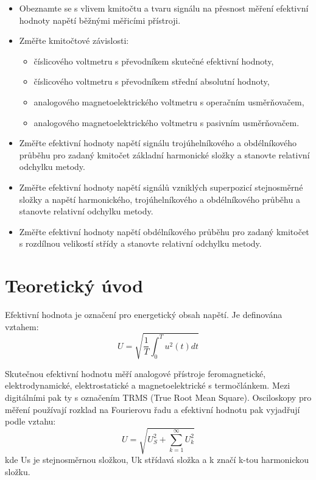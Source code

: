 \documentclass[a4paper, czech]{article}
\begin{document}
\begin{itemize}
    \item Obeznamte se s vlivem kmitočtu a tvaru signálu na přesnost měření efektivní hodnoty
    napětí běžnými měřicími přístroji.
    \item Změřte kmitočtové závislosti:
    \begin{itemize}
        \item číslicového voltmetru s převodníkem skutečné efektivní hodnoty,
        \item číslicového voltmetru s převodníkem střední absolutní hodnoty,
        \item analogového magnetoelektrického voltmetru s operačním usměrňovačem,
        \item analogového magnetoelektrického voltmetru s pasivním usměrňovačem.
    \end{itemize}
    \item Změřte efektivní hodnoty napětí signálu trojúhelníkového a obdélníkového průběhu
    pro zadaný kmitočet základní harmonické složky a stanovte relativní odchylku
    metody.
    \item Změřte efektivní hodnoty napětí signálů vzniklých superpozicí stejnosměrné složky
    a napětí harmonického, trojúhelníkového a obdélníkového průběhu a stanovte relativní
    odchylku metody.
    \item Změřte efektivní hodnoty napětí obdélníkového průběhu pro zadaný kmitočet
    s rozdílnou velikostí střídy a stanovte relativní odchylku metody.
\end{itemize}

\section{Teoretický úvod}

Efektivní hodnota je označení pro energetický obsah napětí.
Je definována vztahem:
\begin{equation*}
    U = \sqrt{\frac{1}{T} \int_0^T u^2\left(t\right) dt}
\end{equation*}

Skutečnou efektivní hodnotu měří analogové přístroje feromagnetické, elektrodynamické, elektrostatické a magnetoelektrické s termočlánkem.
Mezi digitálními pak ty s označením TRMS (True Root Mean Square).
Osciloskopy pro měření používají rozklad na Fourierovu řadu a efektivní hodnotu pak vyjadřují podle vztahu:
\begin{equation*}
    U = \sqrt{U_S^2 + \sum_{k=1}^{\infty} U_k^2}
\end{equation*}
kde Us je stejnosměrnou složkou, Uk střídavá složka a k značí k-tou harmonickou složku.
\end{document}
